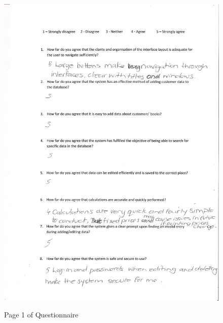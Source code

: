 \begin{figure}[H]
    \includegraphics[width=\textwidth]{./Evaluation/Questionnaire1.png}
    \label{fig:QuestionnairePage1} \caption{Page 1 of Questionnaire}
\end{figure}


